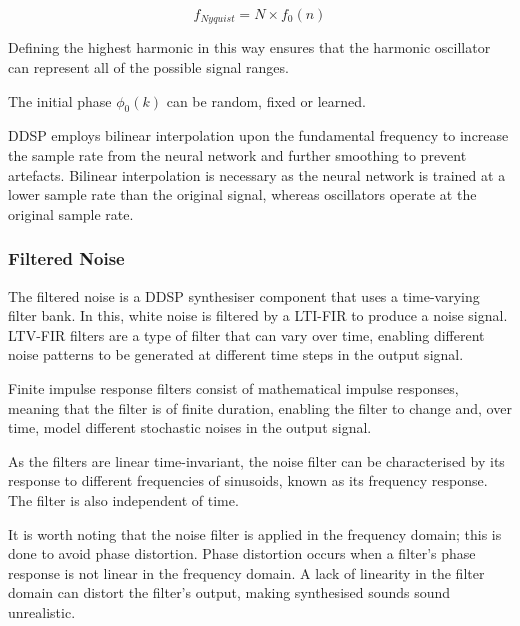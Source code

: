 \begin{equation}
    f_{Nyquist} = N \times f_0(n)
\end{equation}

Defining the highest harmonic in this way ensures that the harmonic oscillator can represent all of the possible signal ranges.

The initial phase $\phi_0(k)$ can be random, fixed or learned\cite{OriginalDDSP}.

DDSP employs bilinear interpolation upon the fundamental frequency to increase the sample rate from the neural network and further smoothing to prevent artefacts. Bilinear interpolation is necessary as the neural network is trained at a lower sample rate than the original signal, whereas oscillators operate at the original sample rate.

\vspace{0.5cm}
\vspace{0.5cm}

\subsubsection{Filtered Noise}

The filtered noise is a DDSP synthesiser component that uses a time-varying filter bank. In this, white noise is filtered by a \acrfull{LTI-FIR} to produce a noise signal. LTV-FIR filters are a type of filter that can vary over time, enabling different noise patterns to be generated at different time steps in the output signal.

Finite impulse response filters consist of mathematical impulse responses, meaning that the filter is of finite duration, enabling the filter to change and, over time, model different stochastic noises in the output signal.

As the filters are linear time-invariant, the noise filter can be characterised by its response to different frequencies of sinusoids, known as its frequency response. The filter is also independent of time.

It is worth noting that the noise filter is applied in the frequency domain; this is done to avoid phase distortion. Phase distortion occurs when a filter's phase response is not linear in the frequency domain. A lack of linearity in the filter domain can distort the filter's output, making synthesised sounds sound unrealistic.

